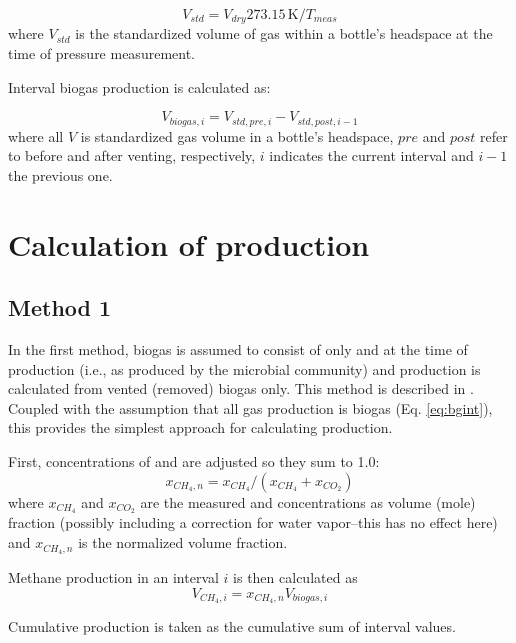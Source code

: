 \documentclass[]{article}
\newcommand{\unit}[1]{\ensuremath{\, \mathrm{#1}}}
\begin{document}
\begin{equation}
  \label{eq:bgstd}
  V_{std} = V_{dry} 273.15 \unit{K}/T_{meas}
\end{equation}
where $V_{std}$ is the standardized volume of gas within a bottle's headspace at the time of pressure measurement.

Interval biogas production is calculated as:

\begin{equation}
  \label{eq:bgint}
  V_{biogas, i} = V_{std, pre, i} - V_{std, post, i - 1}
\end{equation}
where all $V$ is standardized gas volume in a bottle's headspace, $pre$ and $post$ refer to before and after venting, respectively, $i$ indicates the current interval and $i-1$ the previous one.

\section{Calculation of  production}
\subsection{Method 1}
In the first method, biogas is assumed to consist of only  and  at the time of production (i.e., as produced by the microbial community) and  production is calculated from vented (removed) biogas only.
This method is described in \cite{brian1991}.
Coupled with the assumption that all gas production is biogas (Eq. \ref{eq:bgint}), this provides the simplest approach for calculating  production.

First, concentrations of  and  are adjusted so they sum to 1.0:
\begin{equation}
  x_{CH_4, n} = x_{CH_4}/(x_{CH_4} + x_{CO_2})
\end{equation}
where $x_{CH_4}$ and $x_{CO_2}$ are the measured  and  concentrations as volume (mole) fraction (possibly including a correction for water vapor--this has no effect here) and $x_{CH_4, n}$ is the normalized  volume fraction.

Methane production in an interval $i$ is then calculated as
\begin{equation}
  V_{CH_4, i} = x_{CH_4, n} V_{biogas, i}
\end{equation}

Cumulative production is taken as the cumulative sum of interval values. 
\end{document}
